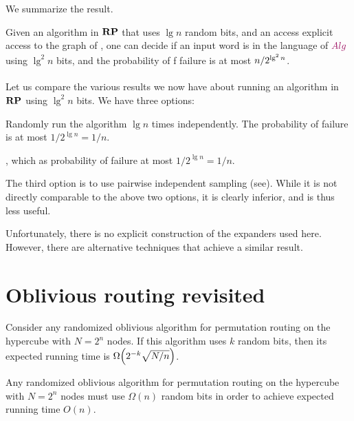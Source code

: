 We summarize the result.
\begin{lemma}
    Given an algorithm \Alg in $\mathbf{RP}$ that uses $\lg n$ random
    bits, and an access explicit access to the graph of
    , one can decide if an input word is in the
    language of $\Alg$ using $\lg^2n$ bits, and the probability of f
    failure is at most $\Bigl.{n}/{2^{\lg^2 n }}$.
\end{lemma}

Let us compare the various results we now have about running an
algorithm in $\mathbf{RP}$ using $\lg^2 n$ bits. We have three
options:
\begin{compactenumA}
    \item Randomly run the algorithm $\lg n$ times independently. The
    probability of failure is at most $1/2^{\lg n} = 1/n$.

    \item {}, which as probability of failure at
    most $1/2^{\lg n} = 1/n$.

    \item The third option is to use pairwise independent
    sampling (see\linebreak {}). While it is not directly
    comparable to the above two options, it is clearly inferior,
    and is thus less useful.

\end{compactenumA}
\bigskip


Unfortunately, there is no explicit construction of the expanders used
here. However, there are alternative techniques that achieve a similar
result.



\section{Oblivious routing revisited}

\begin{theorem}
    Consider any randomized oblivious algorithm for permutation
    routing on the hypercube with $N=2^n$ nodes. If this algorithm
    uses $k$ random bits, then its expected running time is $\Omega
    \pth{ 2^{-k} \sqrt{N/n} }$.
\end{theorem}

\begin{corollary}
    Any randomized oblivious algorithm for permutation routing on the
    hypercube with $N=2^n$ nodes must use $\Omega(n)$ random bits in
    order to achieve expected running time $O(n)$.
\end{corollary}

